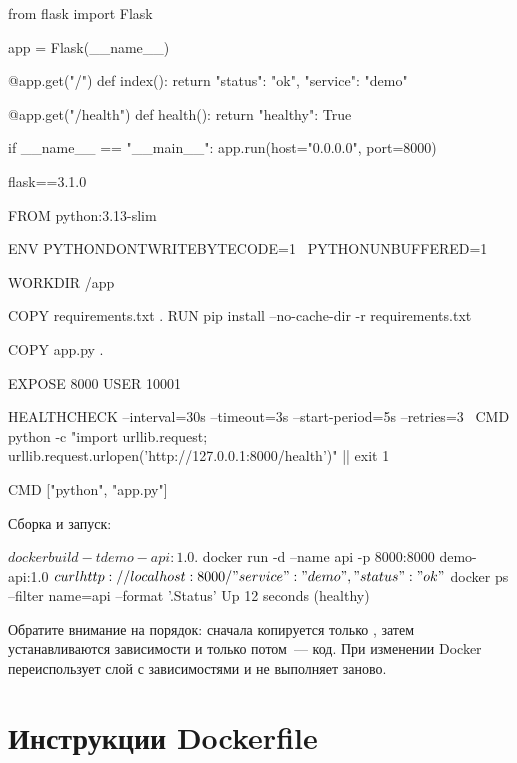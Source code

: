 
\begin{code}[language=python]
from flask import Flask

app = Flask(__name__)

@app.get("/")
def index():
    return {"status": "ok", "service": "demo"}

@app.get("/health")
def health():
    return {"healthy": True}

if __name__ == "__main__":
    app.run(host="0.0.0.0", port=8000)
\end{code}

\begin{code}
flask==3.1.0
\end{code}

\begin{code}[language=dockerfile]
FROM python:3.13-slim

ENV PYTHONDONTWRITEBYTECODE=1 \
    PYTHONUNBUFFERED=1

WORKDIR /app

COPY requirements.txt .
RUN pip install --no-cache-dir -r requirements.txt

COPY app.py .

EXPOSE 8000
USER 10001

HEALTHCHECK --interval=30s --timeout=3s --start-period=5s --retries=3 \
  CMD python -c "import urllib.request; urllib.request.urlopen('http://127.0.0.1:8000/health')" || exit 1

CMD ["python", "app.py"]
\end{code}

Сборка и запуск:

\begin{code}[language=bash]
$ docker build -t demo-api:1.0 .
$ docker run -d --name api -p 8000:8000 demo-api:1.0
$ curl http://localhost:8000/
{"service":"demo","status":"ok"}
$ docker ps --filter name=api --format '{{.Status}}'
Up 12 seconds (healthy)
\end{code}

Обратите внимание на порядок: сначала копируется только
, затем устанавливаются зависимости и только
потом~--- код. При изменении \file{app.py} Docker переиспользует слой
с зависимостями и не выполняет \cmd{pip install} заново.

\section{Инструкции Dockerfile}

